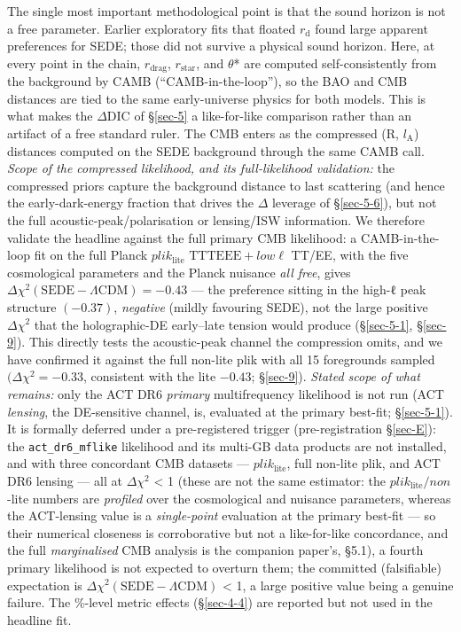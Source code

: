 \documentclass[preprint,12pt]{elsarticle}
\begin{document}
The single most important methodological point is that the sound horizon
is not a free parameter. Earlier exploratory fits that floated
\(r_{\mathrm{d}}\) found large apparent preferences for SEDE; those did
not survive a physical sound horizon. Here, at every point in the chain,
\(r_{\mathrm{drag}}\), \(r_{\mathrm{star}}\), and \(\theta\)* are
computed self-consistently from the background by CAMB
(``CAMB-in-the-loop''), so the BAO and CMB distances are tied to the
same early-universe physics for both models. This is what makes the
\(\Delta \mathrm{DIC}\) of §\ref{sec-5} a like-for-like comparison
rather than an artifact of a free standard ruler. The CMB enters as the
compressed (R, \(l_{\mathrm{A}}\)) distances computed on the SEDE
background through the same CAMB call. \emph{Scope of the compressed
likelihood, and its full-likelihood validation:} the compressed priors
capture the background distance to last scattering (and hence the
early-dark-energy fraction that drives the \(\Delta\) leverage of
§\ref{sec-5-6}), but not the full acoustic-peak/polarisation or
lensing/ISW information. We therefore validate the headline against the
full primary CMB likelihood: a CAMB-in-the-loop fit on the full Planck
\(plik_{\mathrm{lite}}\) \(\mathrm{TTTEEE} + low\ell\) TT/EE, with the
five cosmological parameters and the Planck nuisance \emph{all free},
gives \(\Delta \chi ^{2}(\mathrm{SEDE}-\Lambda \mathrm{CDM}) = -0.43\)
--- the preference sitting in the high-ℓ peak structure \((-0.37)\),
\emph{negative} (mildly favouring SEDE), not the large positive
\(\Delta \chi ^{2}\) that the holographic-DE early--late tension would
produce (§\ref{sec-5-1}, §\ref{sec-9}). This directly tests the
acoustic-peak channel the compression omits, and we have confirmed it
against the full non-lite plik with all 15 foregrounds sampled
\((\Delta \chi ^{2} = -0.33\), consistent with the lite \(-0.43\);
§\ref{sec-9}). \emph{Stated scope of what remains:} only the ACT DR6
\emph{primary} multifrequency likelihood is not run (ACT \emph{lensing},
the DE-sensitive channel, is, evaluated at the primary best-fit;
§\ref{sec-5-1}). It is formally deferred under a pre-registered trigger
(pre-registration §\ref{sec-E}): the \texttt{act\_\allowbreak dr6\_\allowbreak mflike}
likelihood and its multi-GB data products are not installed, and with
three concordant CMB datasets --- \(plik_{\mathrm{lite}}\), full
non-lite plik, and ACT DR6 lensing --- all at
\textbar{}\(\Delta \chi ^{2}\)\textbar{} \textless{} 1 (these are not
the same estimator: the \(plik_{\mathrm{lite}}/non\)-lite numbers are
\emph{profiled} over the cosmological and nuisance parameters, whereas
the ACT-lensing value is a \emph{single-point} evaluation at the primary
best-fit --- so their numerical closeness is corroborative but not a
like-for-like concordance, and the full \emph{marginalised} CMB analysis
is the companion paper's, §5.1), a fourth primary likelihood is not
expected to overturn them; the committed (falsifiable) expectation is
\textbar{}\(\Delta \chi ^{2}(\mathrm{SEDE}-\Lambda \mathrm{CDM})\)\textbar{}
\textless{} 1, a large positive value being a genuine failure. The
\%-level metric effects (§\ref{sec-4-4}) are reported but not used in
the headline fit.
\end{document}
